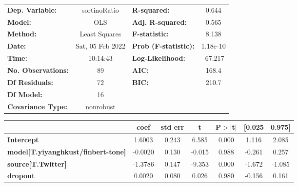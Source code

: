 \begin{center}
\begin{tabular}{lclc}
\toprule
\textbf{Dep. Variable:}                    &   sortinoRatio   & \textbf{  R-squared:         } &     0.644   \\
\textbf{Model:}                            &       OLS        & \textbf{  Adj. R-squared:    } &     0.565   \\
\textbf{Method:}                           &  Least Squares   & \textbf{  F-statistic:       } &     8.138   \\
\textbf{Date:}                             & Sat, 05 Feb 2022 & \textbf{  Prob (F-statistic):} &  1.18e-10   \\
\textbf{Time:}                             &     10:14:43     & \textbf{  Log-Likelihood:    } &   -67.217   \\
\textbf{No. Observations:}                 &          89      & \textbf{  AIC:               } &     168.4   \\
\textbf{Df Residuals:}                     &          72      & \textbf{  BIC:               } &     210.7   \\
\textbf{Df Model:}                         &          16      & \textbf{                     } &             \\
\textbf{Covariance Type:}                  &    nonrobust     & \textbf{                     } &             \\
\bottomrule
\end{tabular}
\begin{tabular}{lcccccc}
                                           & \textbf{coef} & \textbf{std err} & \textbf{t} & \textbf{P$> |$t$|$} & \textbf{[0.025} & \textbf{0.975]}  \\
\midrule
\textbf{Intercept}                         &       1.6003  &        0.243     &     6.585  &         0.000        &        1.116    &        2.085     \\
\textbf{model[T.yiyanghkust/finbert-tone]} &      -0.0020  &        0.130     &    -0.015  &         0.988        &       -0.261    &        0.257     \\
\textbf{source[T.Twitter]}                 &      -1.3786  &        0.147     &    -9.353  &         0.000        &       -1.672    &       -1.085     \\
\textbf{dropout}                           &       0.0020  &        0.080     &     0.026  &         0.980        &       -0.156    &        0.161     \\

\end{tabular}
\end{center}
